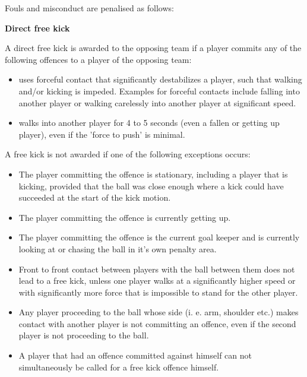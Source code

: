 \clearpage
\sffamily
{\bfseries\color[rgb]{0.4,0.4,0.4}{Law 12 -- Fouls and Misconduct} }
{}

\bigskip

Fouls and misconduct are penalised as follows:

\bigskip

{\color{magenta}
{\bfseries Direct free kick }

\headlinebox

A direct free kick is awarded to the opposing team if a player commits any of the following offences to a player of the opposing team:
\begin{itemize}
\item uses forceful contact that significantly destabilizes a player, such that walking and/or kicking is impeded. Examples for forceful contacts include falling into another player or walking carelessly into another player at significant speed.
\item walks into another player for 4 to 5 seconds (even a fallen or getting up player), even if the 'force to push' is minimal.
\end{itemize}

A free kick is not awarded if one of the following exceptions occurs: 
\begin{itemize}
\item The player committing the offence is stationary, including a player that is kicking, provided that the ball was close enough where a kick could have succeeded at the start of the kick motion.
\item The player committing the offence is currently getting up.
\item The player committing the offence is the current goal keeper and is currently looking at or chasing the ball in it's own penalty area.
\item Front to front contact between players with the ball between them does not lead to a free kick, unless one player walks at a significantly higher speed or with significantly more force that is impossible to stand for the other player.
\item Any player proceeding to the ball whose side (i. e. arm, shoulder etc.)  makes contact with another player is not committing an offence, even if the second player is not proceeding to the ball.
\item A player that had an offence committed against himself can not simultaneously be called for a free kick offence himself.
\end{itemize}}


